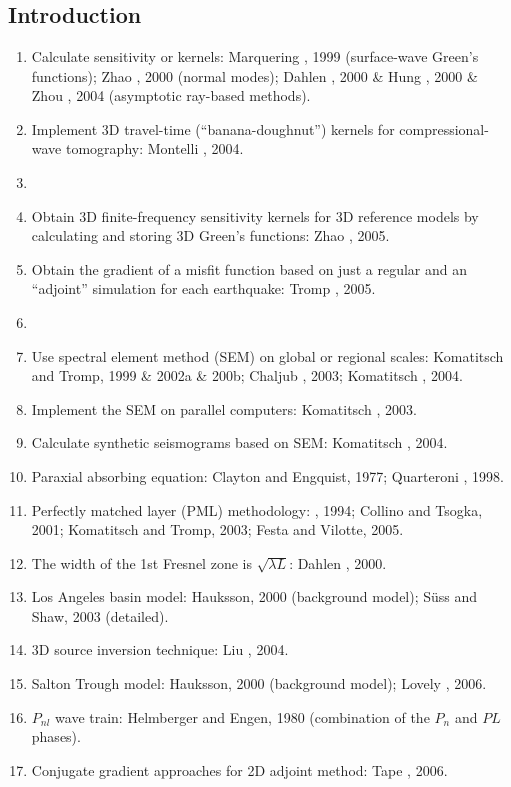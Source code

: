 \renewcommand{\pmk}{Liu\_2006\_BSSA\_Finite-frequency kernels}
\renewcommand{\prf}{FWI/\pmk.pdf}
\renewcommand{\pti}{Finite-frequency kernels based on adjoint methods}
\renewcommand{\pay}{Qinya Liu and Jeroen Tromp, 2006}
\renewcommand{\pjo}{Bulletin of the Seismological Society of America}
\renewcommand{\pda}{2016/12/23 Fri.}

\section{\pinfo}
\subsection{Introduction}
\begin{enumerate}[\hspace{10mm}*]
  \item Calculate sensitivity or \Frechet kernels:
    Marquering \etal, 1999 (surface-wave Green's functions);
    Zhao \etal, 2000 (normal modes);
    Dahlen \etal, 2000 \& Hung \etal, 2000 \& Zhou \etal, 2004 (asymptotic ray-based methods).
  \item Implement 3D travel-time (``banana-doughnut'') kernels for compressional-wave tomography:
    Montelli \etal, 2004.
  \item \sline
  \item Obtain 3D finite-frequency sensitivity kernels for 3D reference models
    by calculating and storing 3D Green's functions: Zhao \etal, 2005.
  \item Obtain the gradient of a misfit function based on
    just a regular and an ``adjoint'' simulation for each earthquake: Tromp \etal, 2005.
  \item \sline
  \item Use spectral element method (SEM) on global or regional scales:
    Komatitsch and Tromp, 1999 \& 2002a \& 200b; Chaljub \etal, 2003; Komatitsch \etal, 2004.
  \item Implement the SEM on parallel computers: Komatitsch \etal, 2003.
  \item Calculate synthetic seismograms based on SEM: Komatitsch \etal, 2004.
  \item Paraxial absorbing equation: Clayton and Engquist, 1977; Quarteroni \etal, 1998.
  \item Perfectly matched layer (PML) methodology: \Berenger, 1994; Collino and Tsogka, 2001;
    Komatitsch and Tromp, 2003; Festa and Vilotte, 2005.
  \item The width of the 1st Fresnel zone is $\sqrt{\lambda L}$: Dahlen \etal, 2000.
  \item Los Angeles basin model: Hauksson, 2000 (background model);
    S\"{u}ss and Shaw, 2003 (detailed).
  \item 3D source inversion technique: Liu \etal, 2004.
  \item Salton Trough model: Hauksson, 2000 (background model); Lovely \etal, 2006.
  \item $P_{nl}$ wave train: Helmberger and Engen, 1980 (combination of the $P_n$ and $PL$ phases).
  \item Conjugate gradient approaches for 2D adjoint method: Tape \etal, 2006.
\end{enumerate}

